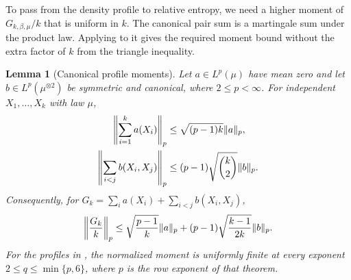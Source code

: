 \documentclass[11pt,reqno]{amsart}
\numberwithin{equation}{section}
\theoremstyle{plain}
\newtheorem{lemma}[lemma]{Lemma}
\theoremstyle{remark}
\DeclarePairedDelimiter{\norm}{\lVert}{\rVert}
\newcommand{\be}{\beta}
\begin{document}
To pass from the density profile to relative entropy, we need a higher moment of $G_{k,\be,\mu}/k$ that is uniform in $k$.  The canonical pair sum is a martingale sum under the product law.  Applying  to it gives the required moment bound without the extra factor of $k$ from the triangle inequality.

\begin{lemma}[Canonical profile moments]\label{quant-tools:lem-profilemoments}
Let $a\in L^p(\mu)$ have mean zero and let $b\in L^p(\mu^{\otimes2})$ be symmetric and canonical, where $2\leq p<\infty$. For independent $X_1,\ldots,X_k$ with law $\mu$,
\begin{align}
 \left\|\sum_{i=1}^ka(X_i)\right\|_p&\leq\sqrt{(p-1)k}\norm a_p,\label{quant-tools:eq-singletonmoment}\\
 \left\|\sum_{i<j}b(X_i,X_j)\right\|_p&\leq(p-1)\sqrt{\binom k2}\norm b_p.\label{quant-tools:eq-pairmoment}
\end{align}
Consequently, for $G_k=\sum_i a(X_i)+\sum_{i<j}b(X_i,X_j)$,
\begin{equation}\label{quant-tools:eq-uniformprofilemoment}
 \left\|\frac{G_k}k\right\|_p
 \leq\sqrt{\frac{p-1}{k}}\norm a_p
 +(p-1)\sqrt{\frac{k-1}{2k}}\norm b_p.
\end{equation}
For the profiles in , the normalized moment is uniformly finite at every exponent $2\leq q\leq\min\{p,6\}$, where $p$ is the row exponent of that theorem.

\end{lemma}
\end{document}
